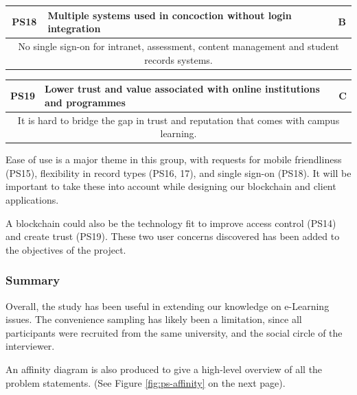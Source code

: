 \begin{table}[!ht]
	\begin{tabularx}{\textwidth}{|c|X|c|}
		\hline
		PS18 & \textbf{Multiple systems used in concoction without login integration} & B                                 \\
		\hline
		\multicolumn{3}{|X|}{No single sign-on for intranet, assessment, content management and student records systems.} \\
		\hline
	\end{tabularx}
\end{table}
\begin{table}[!ht]
	\begin{tabularx}{\textwidth}{|c|X|c|}
		\hline
		PS19 & \textbf{Lower trust and value associated with online institutions and programmes} & C                \\
		\hline
		\multicolumn{3}{|X|}{It is hard to bridge the gap in trust and reputation that comes with campus learning.} \\
		\hline
	\end{tabularx}
\end{table}

Ease of use is a major theme in this group, with requests for mobile friendliness (PS15), 
flexibility in record types (PS16, 17), and single sign-on (PS18). It will be important 
to take these into account while designing our blockchain and client applications.

A blockchain could also be the technology fit to improve access control (PS14) and 
create trust (PS19). These two user concerns discovered has been added to the objectives 
of the project.

\subsubsection{Summary}

Overall, the study has been useful in extending our knowledge on e-Learning issues.
The convenience sampling has likely been a limitation, since all participants were 
recruited from the same university, and the social circle of the interviewer.

An affinity diagram is also produced to give a high-level overview of all the problem statements.
(See Figure \ref{fig:ps-affinity} on the next page).

